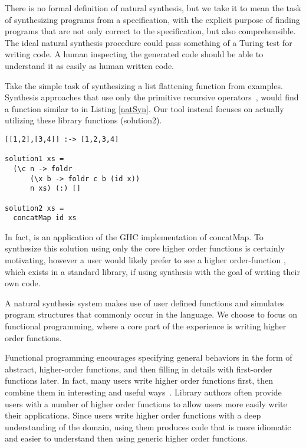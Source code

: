 There is no formal definition of natural synthesis, but we take it to mean the task of synthesizing programs from a specification, with the explicit purpose of finding programs that are not only correct to the specification, but also comprehensible. The ideal natural synthesis procedure could pass something of a Turing test for writing code. A human inspecting the generated code should be able to understand it as easily as human written code.

Take the simple task of synthesizing a list flattening function from examples. 
Synthesis approaches that use only the primitive recursive operators~\cite{Osera:2015,FeserCD15}, would find a function similar to  in Listing \ref{natSyn}.
Our tool instead focuses on actually utilizing these library functions (solution2).

\begin{lstlisting}[caption=Low-level synthesis vs. Natural synthesis,label=natSyn]
[[1,2],[3,4]] :-> [1,2,3,4]

solution1 xs = 
  (\c n -> foldr 
      (\x b -> foldr c b (id x))
      n xs) (:) []
      
solution2 xs =
  concatMap id xs
\end{lstlisting}

\noindent In fact,  is an application of the GHC\cite{ghc} implementation of concatMap. To synthesize this solution using only the core higher order functions is certainly motivating, however a user would likely prefer to see a higher order-function , which exists in a standard library, if using synthesis with the goal of writing their own code.

A natural synthesis system makes use of user defined functions and simulates program structures that commonly occur in the language.  
We choose to focus on functional programming, where a core part of the experience is writing higher order functions.  

Functional programming encourages specifying general behaviors in the form of abstract, higher-order functions, and then filling in details with first-order functions later.
In fact, many users write higher order functions first, then combine them in interesting and useful ways~\cite{Lipovaca:2011}.
Library authors often provide users with a number of higher order functions to allow users more easily write their applications.
Since users write higher order functions with a deep understanding of the domain, using them produces code that is more idiomatic and easier to understand then using generic higher order functions.

